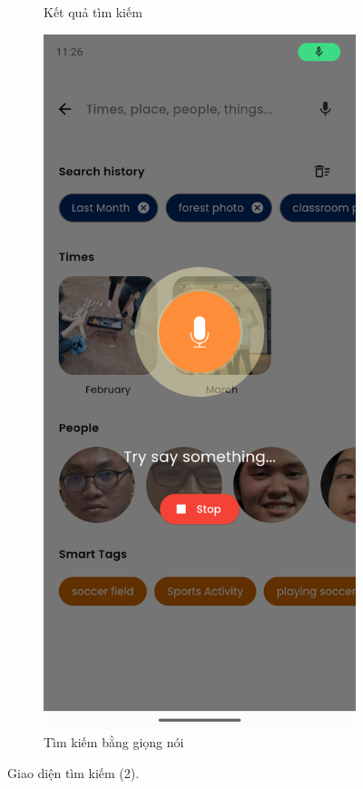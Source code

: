 \begin{figure}[H]
\begin{subfigure}{0.48\textwidth}
        \caption{Kết quả tìm kiếm}
    \end{subfigure}
    \hfill
    \begin{subfigure}{0.48\textwidth}
        \includegraphics[width=1\linewidth]{figures/c4/4-2/search_3.png} 
        \caption{Tìm kiếm bằng giọng nói}
    \end{subfigure}
    \caption{Giao diện tìm kiếm (2).}
    \label{fig:search-result}
\end{figure}